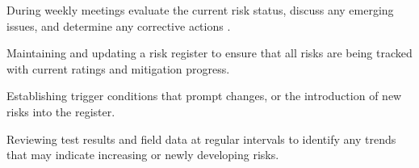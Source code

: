 \begin {
      enumerate
    }
    \item During weekly meetings evaluate the current risk status,
        discuss any emerging issues,
        and determine any corrective actions
                .
    \item Maintaining and updating a risk register to ensure that all risks are
                    being tracked with current ratings and mitigation progress.
    \item Establishing trigger conditions that prompt changes,
        or
            the introduction of new risks into the register.
    \item Reviewing test results and field data at regular intervals to
                identify any trends that may indicate increasing or
            newly developing risks.
\end {
      enumerate
    }
